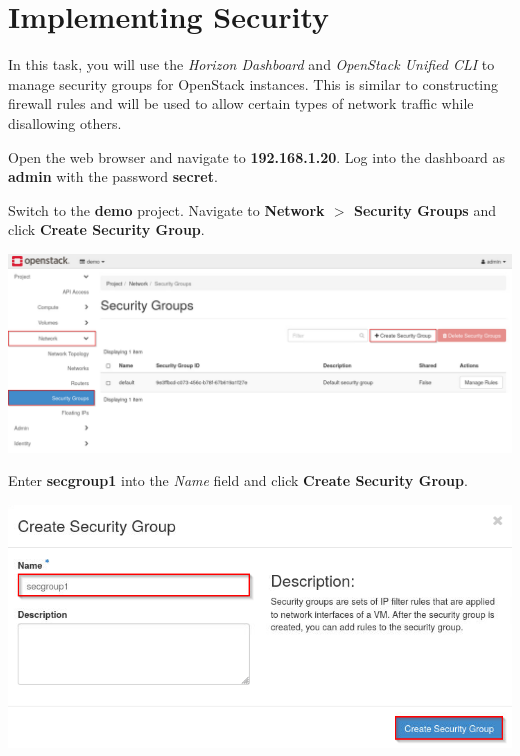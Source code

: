 \documentclass[letterpaper, 12pt]{article}
\begin{document}
\section{Implementing Security}\label{sec:implementing_security}
In this task, you will use the \textit{Horizon Dashboard} and \textit{OpenStack Unified CLI} to manage security groups for OpenStack instances.
This is similar to constructing firewall rules and will be used to allow certain types of network traffic while disallowing others.

\begin{enumerate}
    \begin{labstep}
        Open the web browser and navigate to \textbf{192.168.1.20}.
        Log into the dashboard as \textbf{admin} with the password \textbf{secret}.
    \end{labstep}

    \begin{labstep}
        Switch to the \textbf{demo} project.
        Navigate to \textbf{Network $>$ Security Groups} and click \textbf{Create Security Group}.

        \begin{center}
            \includegraphics[width=\linewidth]{images/part5/step2.png}
        \end{center}
    \end{labstep}

    \begin{labstep}
        Enter \textbf{secgroup1} into the \textit{Name} field and click \textbf{Create Security Group}.

        \begin{center}
            \includegraphics[width=\linewidth]{images/part5/step3.png}
        \end{center}
    \end{labstep}


\end{enumerate}
\end{document}
